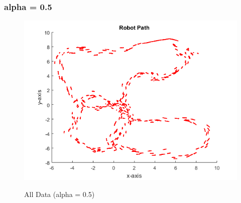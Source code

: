 		\subsubsection{alpha = 0.5}
			\begin{figure}[position = here]
				\begin{centering}
					\includegraphics[scale=1]{./images/q1/dr_newcomppointfive_gpspointfive}\\
					\caption[\textit{A3}]{All Data (alpha = 0.5)\label{RPallfive}}
				\end{centering}
			\end{figure}
			
%			
		
		
		\pagebreak
